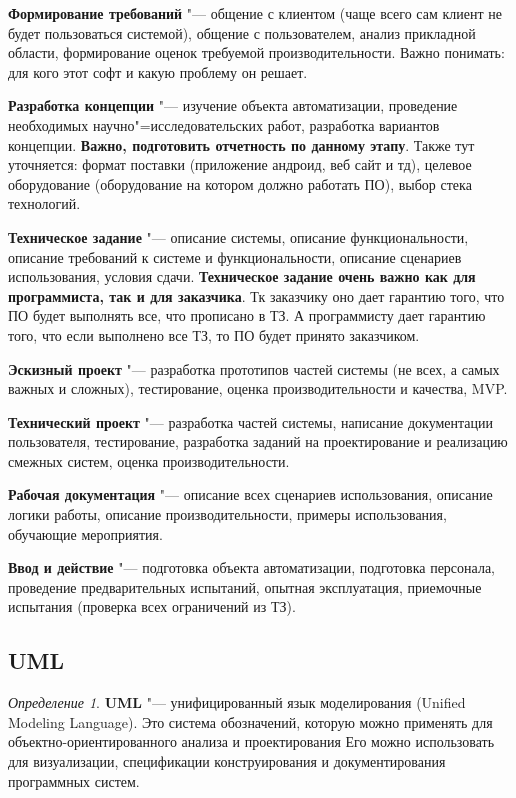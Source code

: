 \documentclass[bachelor, och, pract]{SCWorks}
\theoremstyle{remark}
\newtheorem{definition}{Определение}
\begin{document}
    \textbf{Формирование требований} "--- общение с клиентом (чаще всего сам клиент не будет пользоваться системой), общение с пользователем, анализ прикладной области, формирование оценок требуемой производительности. Важно понимать: для кого этот софт и какую проблему он решает.
    

    \textbf{Разработка концепции} "--- изучение объекта автоматизации, проведение необходимых научно"=исследовательских работ, разработка вариантов концепции. \textbf{Важно, подготовить отчетность по данному этапу}. Также тут уточняется: формат поставки (приложение андроид, веб сайт и тд), целевое оборудование (оборудование на котором должно работать ПО), выбор стека технологий.

    \textbf{Техническое задание} "--- описание системы, описание функциональности, описание требований к системе и функциональности, описание сценариев использования, условия сдачи. \textbf{Техническое задание очень важно как для программиста, так и для заказчика}. Тк заказчику оно дает гарантию того, что ПО будет выполнять все, что прописано в ТЗ. А программисту дает гарантию того, что если выполнено все ТЗ, то ПО будет принято заказчиком.

    \textbf{Эскизный проект} "--- разработка прототипов частей системы (не всех, а самых важных и сложных), тестирование, оценка производительности и качества, MVP.

    \textbf{Технический проект} "--- разработка частей системы, написание документации пользователя, тестирование, разработка заданий на проектирование и реализацию смежных систем, оценка производительности.

    \textbf{Рабочая документация} "--- описание всех сценариев использования, описание логики работы, описание производительности, примеры использования, обучающие мероприятия.

    \textbf{Ввод и действие} "--- подготовка объекта автоматизации, подготовка персонала, проведение предварительных испытаний, опытная эксплуатация, приемочные испытания (проверка всех ограничений из ТЗ).

    \subsection{UML}

    \begin{definition}
        \textbf{UML} "--- унифицированный язык моделирования (Unified Modeling Language). Это система обозначений, которую можно применять для объектно-ориентированного анализа и проектирования Его можно использовать для визуализации, спецификации конструирования и документирования программных систем.
    \end{definition}
\end{document}
